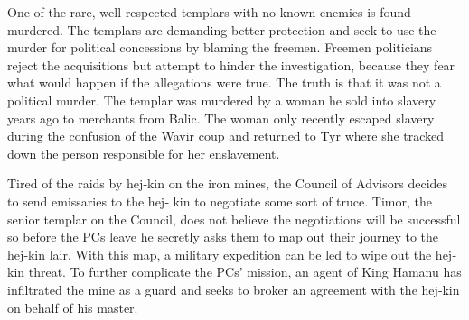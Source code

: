 {	\item One of the rare, well‐respected templars with no known enemies is found murdered. The templars are demanding better protection and seek to use the murder for political concessions by blaming the freemen. Freemen politicians reject the acquisitions but attempt to hinder the investigation, because they fear what would happen if the allegations were true. The truth is that it was not a political murder. The templar was murdered by a woman he sold into slavery years ago to merchants from Balic. The woman only recently escaped slavery during the confusion of the Wavir coup and returned to Tyr where she tracked down the person responsible for her enslavement.
	\item Tired of the raids by hej‐kin on the iron mines, the Council of Advisors decides to send emissaries to the hej‐ kin to negotiate some sort of truce. Timor, the senior templar on the Council, does not believe the negotiations will be successful so before the PCs leave he secretly asks them to map out their journey to the hej‐kin lair. With this map, a military expedition can be led to wipe out the hej‐ kin threat. To further complicate the PCs’ mission, an agent of King Hamanu has infiltrated the mine as a guard and seeks to broker an agreement with the hej‐kin on behalf of his master.
}